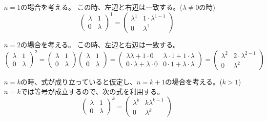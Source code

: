 \documentclass[12pt,b5paper]{ltjsarticle}
\begin{document}
\begin{enumerate}
       \hrulefill

       $n=1$の場合を考える。
       この時、左辺と右辺は一致する。($\lambda\ne 0$の時)
       \begin{equation}
        \begin{pmatrix} \lambda & 1 \\ 0 & \lambda \end{pmatrix}^{\!\!1} = \begin{pmatrix} \lambda^{1} & 1\cdot\lambda^{1-1} \\ 0 & \lambda^{1} \end{pmatrix}
       \end{equation}

       \dotfill

       $n=2$の場合を考える。
       この時、左辺と右辺は一致する。
       \begin{equation}
        \begin{pmatrix} \lambda & 1 \\ 0 & \lambda \end{pmatrix}^{\!\!2}
          = \begin{pmatrix} \lambda & 1 \\ 0 & \lambda \end{pmatrix}\begin{pmatrix} \lambda & 1 \\ 0 & \lambda \end{pmatrix}
          = \begin{pmatrix} \lambda\lambda + 1\cdot0 & \lambda\cdot1+1\cdot\lambda \\ 0\cdot\lambda+\lambda\cdot0 & 0\cdot1+\lambda\cdot\lambda \end{pmatrix}
          = \begin{pmatrix} \lambda^{2} & 2\cdot\lambda^{2-1} \\ 0 & \lambda^{2} \end{pmatrix}
       \end{equation}

       \dotfill

       $n=k$の時、式が成り立っていると仮定し、$n=k+1$の場合を考える。($k>1$)
       $n=k$では等号が成立するので、次の式を利用する。
       \begin{equation}
        \begin{pmatrix} \lambda & 1 \\ 0 & \lambda \end{pmatrix}^{\!\!k} = \begin{pmatrix} \lambda^{k} & k\lambda^{k-1} \\ 0 & \lambda^{k} \end{pmatrix}
       \end{equation}


\end{enumerate}
\end{document}
